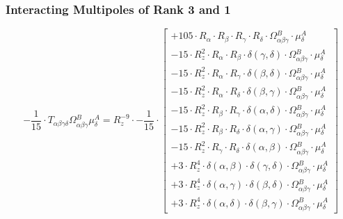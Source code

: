 \documentclass{article}
\begin{document}
\subsubsection{Interacting Multipoles of Rank 3 and 1}
\begin{equation}
- \frac{1}{15} \cdot T_{\alpha{}\beta{}\gamma{}\delta{}} \Omega{}^{B}_{\alpha{}\beta{}\gamma{}} \mu{}^{A}_{\delta{}} = R_{z}^{-9} \cdot - \frac{1}{15} \cdot  \left[ \begin{array}{c} 
 		+ 105 \cdot R_{\alpha{}} \cdot R_{\beta{}} \cdot R_{\gamma{}} \cdot R_{\delta{}} \cdot \Omega{}^{B}_{\alpha{}\beta{}\gamma{}} \cdot \mu{}^{A}_{\delta{}} 
 \\[0.2em] 		 - 15 \cdot R_{z}^{2} \cdot R_{\alpha{}} \cdot R_{\beta{}} \cdot \delta{}\left(\gamma{}, \delta{}\right) \cdot \Omega{}^{B}_{\alpha{}\beta{}\gamma{}} \cdot \mu{}^{A}_{\delta{}} 
 \\[0.2em] 		 - 15 \cdot R_{z}^{2} \cdot R_{\alpha{}} \cdot R_{\gamma{}} \cdot \delta{}\left(\beta{}, \delta{}\right) \cdot \Omega{}^{B}_{\alpha{}\beta{}\gamma{}} \cdot \mu{}^{A}_{\delta{}} 
 \\[0.2em] 		 - 15 \cdot R_{z}^{2} \cdot R_{\alpha{}} \cdot R_{\delta{}} \cdot \delta{}\left(\beta{}, \gamma{}\right) \cdot \Omega{}^{B}_{\alpha{}\beta{}\gamma{}} \cdot \mu{}^{A}_{\delta{}} 
 \\[0.2em] 		 - 15 \cdot R_{z}^{2} \cdot R_{\beta{}} \cdot R_{\gamma{}} \cdot \delta{}\left(\alpha{}, \delta{}\right) \cdot \Omega{}^{B}_{\alpha{}\beta{}\gamma{}} \cdot \mu{}^{A}_{\delta{}} 
 \\[0.2em] 		 - 15 \cdot R_{z}^{2} \cdot R_{\beta{}} \cdot R_{\delta{}} \cdot \delta{}\left(\alpha{}, \gamma{}\right) \cdot \Omega{}^{B}_{\alpha{}\beta{}\gamma{}} \cdot \mu{}^{A}_{\delta{}} 
 \\[0.2em] 		 - 15 \cdot R_{z}^{2} \cdot R_{\gamma{}} \cdot R_{\delta{}} \cdot \delta{}\left(\alpha{}, \beta{}\right) \cdot \Omega{}^{B}_{\alpha{}\beta{}\gamma{}} \cdot \mu{}^{A}_{\delta{}} 
 \\[0.2em] 		 + 3 \cdot R_{z}^{4} \cdot \delta{}\left(\alpha{}, \beta{}\right) \cdot \delta{}\left(\gamma{}, \delta{}\right) \cdot \Omega{}^{B}_{\alpha{}\beta{}\gamma{}} \cdot \mu{}^{A}_{\delta{}} 
 \\[0.2em] 		 + 3 \cdot R_{z}^{4} \cdot \delta{}\left(\alpha{}, \gamma{}\right) \cdot \delta{}\left(\beta{}, \delta{}\right) \cdot \Omega{}^{B}_{\alpha{}\beta{}\gamma{}} \cdot \mu{}^{A}_{\delta{}} 
 \\[0.2em] 		 + 3 \cdot R_{z}^{4} \cdot \delta{}\left(\alpha{}, \delta{}\right) \cdot \delta{}\left(\beta{}, \gamma{}\right) \cdot \Omega{}^{B}_{\alpha{}\beta{}\gamma{}} \cdot \mu{}^{A}_{\delta{}}
 \end{array}\right] 
\end{equation}
\end{document}
